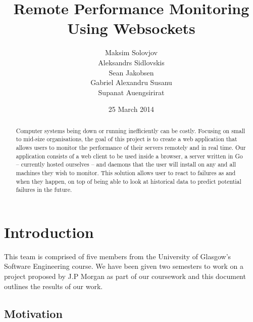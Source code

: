 \documentclass{l3proj}
\begin{document}
\title{Remote Performance Monitoring Using Websockets}
\author{Maksim Solovjov \\
        Aleksandrs Sidlovskis \\
        Sean Jakobsen \\
        Gabriel Alexandru Susanu \\
        Supanat Auengsirirat}
\date{25 March 2014}
\maketitle
\begin{abstract}

Computer systems being down or running inefficiently can be costly. Focusing on small to mid-size organisations, the goal of this project is to create a web application that allows users to monitor the performance of their servers remotely and in real time. Our application consists of a web client to be used inside a browser, a server written in Go -- currently hosted ourselves -- and daemons that the user will install on any and all machines they wish to monitor. This solution allows user to react to failures as and when they happen, on top of being able to look at historical data to predict potential failures in the future.

\end{abstract}
\educationalconsent
\tableofcontents



\chapter{Introduction}
\label{intro}

This team is comprised of five members from the University of Glasgow's Software Engineering course. We have been given two semesters to work on a project proposed by J.P Morgan as part of our coursework and this document outlines the results of our work.

\section{Motivation}
\label{motivation}
\end{document}
